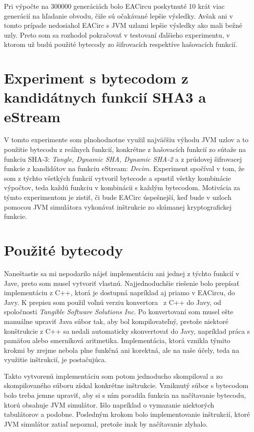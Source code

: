 Pri výpočte na 300000 generáciách bolo EACircu poskytnuté 10 krát viac generácií na hľadanie obvodu, čiže sú očakávané lepšie výsledky. Avšak ani v tomto prípade nedosiahol EACirc s JVM uzlami lepšie výsledky ako mali bežné uzly. Preto som sa rozhodol pokračovať v testovaní ďalšieho experimentu, v ktorom už budú použité bytecody zo šifrovacích respektíve hašovacích funkcií.

\section{Experiment s bytecodom z kandidátnych funkcií SHA3 a eStream}
\label{sec:exp2}

V tomto experimente som plnohodnotne využil najväčšiu výhodu JVM uzlov a to použitie bytecodu z reálnych funkcií, konkrétne z hašovacích funkcií zo sútaže na funkciu SHA-3: \textit{Tangle, Dynamic SHA, Dynamic SHA-2} a z prúdovej šifrovacej funkcie z kandidátov na funkciu eStream: \textit{Decim}. Experiment spočíval v tom, že som z týchto všetkých funkcií vytvoril bytecode a spustil všetky kombinácie výpočtov, teda každú funkciu v kombinácii s každým bytecodom. Motivácia za týmto experimentom je zistiť, či bude EACirc úspešnejší, keď bude v uzloch pomocou JVM simulátora vykonávať inštrukcie zo skúmanej kryptografickej funkcie. 

\section{Použité bytecody}
\label{sec:exp2-bytecode}

Naneštastie sa mi nepodarilo nájsť implementáciu ani jednej z týchto funkcií v Jave, preto som musel vytvoriť vlastnú. Najjednoduchšie riešenie bolo prepísať implementáciu z C++, ktorá je dostupná napríklad aj priamo v EACircu, do Javy. K prepisu som použil voľnú verziu konvertora~\parencite{c++-java-converter} z C++ do Javy, od spoločnosti \textit{Tangible Software Solutions Inc}. Po konvertovaní som musel ešte manuálne upraviť Java súbor tak, aby bol kompilovateľný, pretože niektoré konštrukcie z C++ sa nedali automaticky skonvertovať do Javy, napríklad práca s pamäťou alebo smerníková aritmetika. Implementácia, ktorá vznikla týmito krokmi by zrejme nebola plne funkčná ani korektná, ale na naše účely, teda na využitie inštrukcií, je postačujúca. 

Takto vytvorenú implementáciu som potom jednoducho skompiloval a zo skompilovaného súboru získal konkrétne inštrukcie. Vzniknutý súbor s bytecodom bolo treba jemne upraviť, aby si s ním poradila funkcia na načítavanie bytecodu, ktorú obsahuje JVM simulátor. Išlo napríklad o vymazanie niektorých tabulátorov a podobne. Posledným krokom bolo implementovanie inštrukcií, ktoré JVM simulátor zatiaľ nepoznal, pretože inak by načítavanie zlyhalo.

